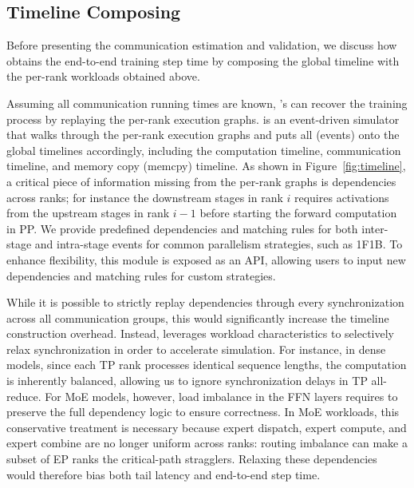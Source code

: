 \subsection{Timeline Composing } 
\label{subsec:workload_replay}

\noindent Before presenting the communication estimation and validation, we discuss how \sys obtains the end-to-end training step time by composing the global timeline with the per-rank workloads obtained above.

Assuming all communication running times are known, \sys's \ma can recover the training process by replaying the per-rank execution graphs.
\ma is an event-driven simulator that walks through the per-rank execution graphs and puts all \ops (events) onto the global timelines accordingly, including the computation timeline, communication timeline, and memory copy (memcpy) timeline. 
As shown in Figure~\ref{fig:timeline}, a critical piece of information missing from the per-rank graphs is dependencies across ranks; for instance the downstream stages in rank $i$ requires activations from the upstream stages in rank $i-1$ before starting the forward computation in PP.
We provide predefined dependencies and matching rules for both inter-stage and intra-stage events for common parallelism strategies, such as 1F1B.
To enhance flexibility, this module is exposed as an API, allowing users to input new dependencies and matching rules for custom strategies.

While it is possible to strictly replay dependencies through every synchronization across all communication groups, this would significantly increase the timeline construction overhead. 
Instead, \sys leverages workload characteristics to selectively relax synchronization in order to accelerate simulation. 
For instance, in dense models, since each TP rank processes identical sequence lengths, the computation is inherently balanced, allowing us to ignore synchronization delays in TP all-reduce. 
For MoE models, however, load imbalance in the FFN layers requires \sys to preserve the full dependency logic to ensure correctness. In MoE workloads, this conservative treatment is necessary because expert dispatch, expert compute, and expert combine are no longer uniform across ranks: routing imbalance can make a subset of EP ranks the critical-path stragglers. Relaxing these dependencies would therefore bias both tail latency and end-to-end step time.

